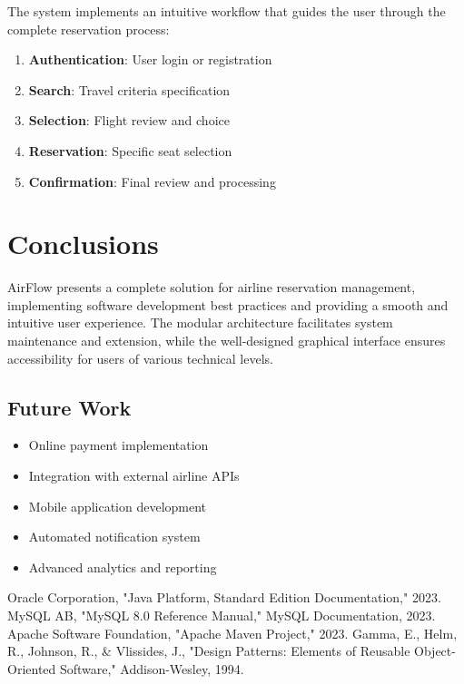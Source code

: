 \documentclass[conference]{IEEEtran}
\begin{document}
The system implements an intuitive workflow that guides the user through the complete reservation process:

\begin{enumerate}
    \item \textbf{Authentication}: User login or registration
    \item \textbf{Search}: Travel criteria specification
    \item \textbf{Selection}: Flight review and choice
    \item \textbf{Reservation}: Specific seat selection
    \item \textbf{Confirmation}: Final review and processing
\end{enumerate}

\section{Conclusions}

AirFlow presents a complete solution for airline reservation management, implementing software development best practices and providing a smooth and intuitive user experience. The modular architecture facilitates system maintenance and extension, while the well-designed graphical interface ensures accessibility for users of various technical levels.

\subsection{Future Work}
\begin{itemize}
    \item Online payment implementation
    \item Integration with external airline APIs
    \item Mobile application development
    \item Automated notification system
    \item Advanced analytics and reporting
\end{itemize}

\begin{thebibliography}{00}
 Oracle Corporation, "Java Platform, Standard Edition Documentation," 2023.
 MySQL AB, "MySQL 8.0 Reference Manual," MySQL Documentation, 2023.
 Apache Software Foundation, "Apache Maven Project," 2023.
 Gamma, E., Helm, R., Johnson, R., \& Vlissides, J., "Design Patterns: Elements of Reusable Object-Oriented Software," Addison-Wesley, 1994.
\end{thebibliography}
\end{document}
